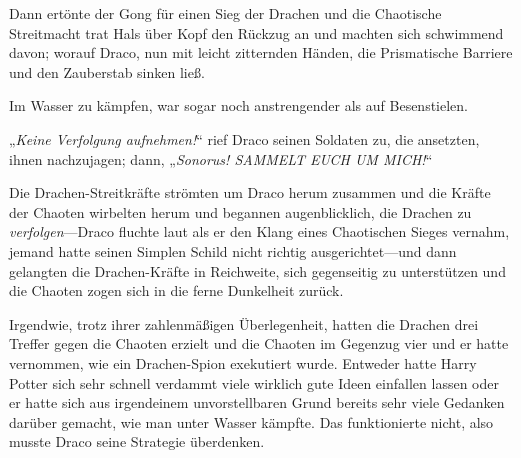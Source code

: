 Dann ertönte der Gong für einen Sieg der Drachen und die Chaotische Streitmacht trat Hals über Kopf den Rückzug an und machten sich schwimmend davon; worauf Draco, nun mit leicht zitternden Händen, die Prismatische Barriere und den Zauberstab sinken ließ.

Im Wasser zu kämpfen, war sogar noch anstrengender als auf Besenstielen.

„\emph{Keine Verfolgung aufnehmen!}“ rief Draco seinen Soldaten zu, die ansetzten, ihnen nachzujagen; dann, „\emph{Sonorus! SAMMELT EUCH UM MICH!}“

Die Drachen-Streitkräfte strömten um Draco herum zusammen und die Kräfte der Chaoten wirbelten herum und begannen augenblicklich, die Drachen zu \emph{verfolgen}—Draco fluchte laut als er den Klang eines Chaotischen Sieges vernahm, jemand hatte seinen Simplen Schild nicht richtig ausgerichtet—und dann gelangten die Drachen-Kräfte in Reichweite, sich gegenseitig zu unterstützen und die Chaoten zogen sich in die ferne Dunkelheit zurück.

Irgendwie, trotz ihrer zahlenmäßigen Überlegenheit, hatten die Drachen drei Treffer gegen die Chaoten erzielt und die Chaoten im Gegenzug vier und er hatte vernommen, wie ein Drachen-Spion exekutiert wurde. Entweder hatte Harry Potter sich sehr schnell verdammt viele wirklich gute Ideen einfallen lassen oder er hatte sich aus irgendeinem unvorstellbaren Grund bereits sehr viele Gedanken darüber gemacht, wie man unter Wasser kämpfte. Das funktionierte nicht, also musste Draco seine Strategie überdenken.

